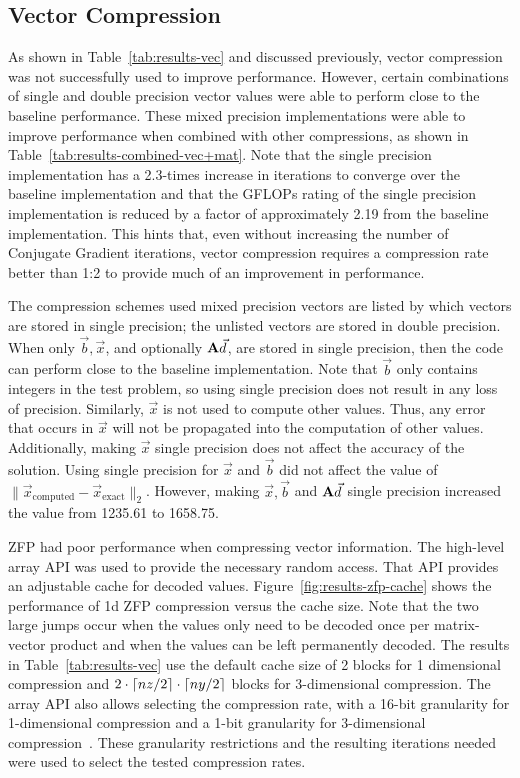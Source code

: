 

\subsection{Vector Compression}
\label{sec:results-vec}
As shown in Table~\ref{tab:results-vec} and discussed previously, vector compression was not successfully used to improve performance.
However, certain combinations of single and double precision vector values were able to perform close to the baseline performance.
These mixed precision implementations were able to improve performance when combined with other compressions, as shown in Table~\ref{tab:results-combined-vec+mat}.
Note that the single precision implementation has a 2.3-times increase in iterations to converge over the baseline implementation and that the GFLOPs rating of the single precision implementation is reduced by a factor of approximately 2.19 from the baseline implementation.
This hints that, even without increasing the number of Conjugate Gradient iterations, vector compression requires a compression rate better than 1:2 to provide much of an improvement in performance.

The compression schemes used mixed precision vectors are listed by which vectors are stored in single precision; the unlisted vectors are stored in double precision.
When only \(\vec{b}, \vec{x}\), and optionally \(\mathbf{A}\vec{d}\), are stored in single precision, then the code can perform close to the baseline implementation.
Note that \(\vec{b}\) only contains integers in the test problem, so using single precision does not result in any loss of precision.
Similarly, \(\vec{x}\) is not used to compute other values.
Thus, any error that occurs in \(\vec{x}\) will not be propagated into the computation of other values.
Additionally, making \(\vec{x}\) single precision does not affect the accuracy of the solution.
Using single precision for \(\vec{x}\) and \(\vec{b}\) did not affect the value of \(\|\vec{x}_\text{computed} - \vec{x}_\text{exact}\|_2\).
However, making \(\vec{x}, \vec{b}\) and \(\mathbf{A}\vec{d}\) single precision increased the value from 1235.61 to 1658.75.

ZFP had poor performance when compressing vector information.
The high-level array API was used to provide the necessary random access.
That API provides an adjustable cache for decoded values.
Figure~\ref{fig:results-zfp-cache} shows the performance of 1d ZFP compression versus the cache size.
Note that the two large jumps occur when the values only need to be decoded once per matrix-vector product and when the values can be left permanently decoded.
The results in Table~\ref{tab:results-vec} use the default cache size of 2 blocks for 1 dimensional compression and \({2\cdot\lceil nz/2\rceil\cdot\lceil ny/2\rceil}\) blocks for 3-dimensional compression.
The array API also allows selecting the compression rate, with a 16-bit granularity for 1-dimensional compression and a 1-bit granularity for 3-dimensional compression~\cite{Lindstrom:2014:zfp}.
These granularity restrictions and the resulting iterations needed were used to select the tested compression rates.

